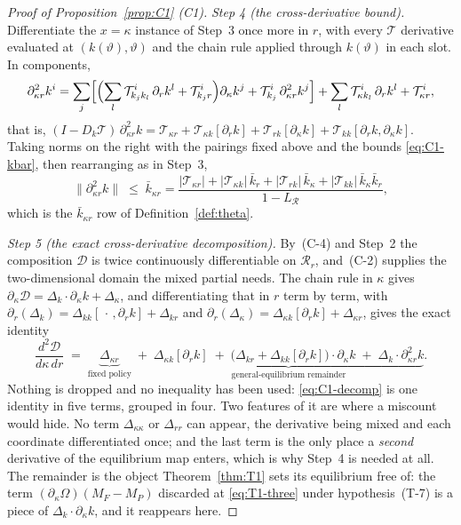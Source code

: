 \documentclass[11pt]{article}
\newcommand{\Tmap}{\mathcal{T}}
\begin{document}
\begin{proof}[Proof of Proposition~\ref{prop:C1} (C1)]
\emph{Step 4 (the cross-derivative bound).} Differentiate the $x = \kappa$ instance of Step~3 once
more in $r$, with every $\Tmap$ derivative evaluated at $(k(\vartheta),\vartheta)$ and the chain
rule applied through $k(\vartheta)$ in each slot. In components,
\[
\partial^2_{\kappa r}k^i
= \sum_j\Bigl[\Bigl(\sum_l\Tmap^i_{k_jk_l}\,\partial_r k^l + \Tmap^i_{k_jr}\Bigr)\partial_\kappa k^j
+ \Tmap^i_{k_j}\,\partial^2_{\kappa r}k^j\Bigr]
+ \sum_l\Tmap^i_{\kappa k_l}\,\partial_r k^l + \Tmap^i_{\kappa r},
\]
that is,
$(I-D_k\Tmap)\,\partial^2_{\kappa r}k = \Tmap_{\kappa r} + \Tmap_{\kappa k}[\partial_r k]
+ \Tmap_{rk}[\partial_\kappa k] + \Tmap_{kk}[\partial_r k,\partial_\kappa k]$. Taking norms on the
right with the pairings fixed above and the bounds \eqref{eq:C1-kbar}, then rearranging as in
Step~3,
\begin{equation}
\label{eq:C1-kkr}
\lVert\partial^2_{\kappa r}k\rVert
\;\le\; \bar k_{\kappa r}
= \frac{\lvert\Tmap_{\kappa r}\rvert + \lvert\Tmap_{\kappa k}\rvert\,\bar k_r
+ \lvert\Tmap_{rk}\rvert\,\bar k_\kappa + \lvert\Tmap_{kk}\rvert\,\bar k_\kappa\bar k_r}
{1-L_{\mathcal R}},
\end{equation}
which is the $\bar k_{\kappa r}$ row of Definition~\ref{def:theta}.

\emph{Step 5 (the exact cross-derivative decomposition).} By~(C-4) and Step~2 the composition
$\mathcal D$ is twice continuously differentiable on $\mathcal R_r$, and~(C-2) supplies the
two-dimensional domain the mixed partial needs. The chain rule in $\kappa$ gives
$\partial_\kappa\mathcal D = \Delta_k\cdot\partial_\kappa k + \Delta_\kappa$, and differentiating
that in $r$ term by term, with
$\partial_r(\Delta_k) = \Delta_{kk}[\,\cdot\,,\partial_r k] + \Delta_{kr}$ and
$\partial_r(\Delta_\kappa) = \Delta_{\kappa k}[\partial_r k] + \Delta_{\kappa r}$, gives the exact
identity
\begin{equation}
\label{eq:C1-decomp}
\frac{d^2\mathcal D}{d\kappa\,dr}
\;=\; \underbrace{\Delta_{\kappa r}}_{\text{fixed policy}}
\;+\; \underbrace{\Delta_{\kappa k}[\partial_r k]
\;+\; \bigl(\Delta_{kr} + \Delta_{kk}[\partial_r k]\bigr)\cdot\partial_\kappa k
\;+\; \Delta_k\cdot\partial^2_{\kappa r}k}_{\text{general-equilibrium remainder}} .
\end{equation}
Nothing is dropped and no inequality has been used: \eqref{eq:C1-decomp} is one identity in five
terms, grouped in four. Two features of it are where a miscount would hide. No term
$\Delta_{\kappa\kappa}$ or $\Delta_{rr}$ can appear, the derivative being mixed and each coordinate
differentiated once; and the last term is the only place a \emph{second} derivative of the
equilibrium map enters, which is why Step~4 is needed at all. The remainder is the object
Theorem~\ref{thm:T1} sets its equilibrium free of: the term
$(\partial_\kappa\Omega)(M_F - M_P)$ discarded at \eqref{eq:T1-three} under hypothesis~(T-7) is a
piece of $\Delta_k\cdot\partial_\kappa k$, and it reappears here.


\end{proof}
\end{document}
